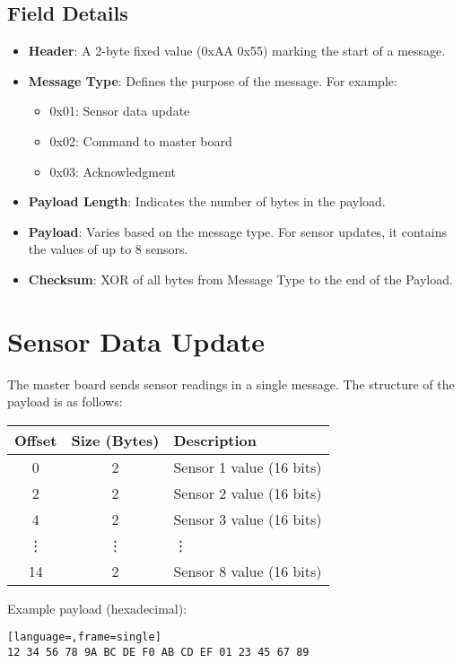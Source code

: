 \documentclass{article}
\begin{document}
\subsection{Field Details}
\begin{itemize}
    \item \textbf{Header}: A 2-byte fixed value (0xAA 0x55) marking the start of a message.
    \item \textbf{Message Type}: Defines the purpose of the message. For example:
    \begin{itemize}
        \item 0x01: Sensor data update
        \item 0x02: Command to master board
        \item 0x03: Acknowledgment
    \end{itemize}
    \item \textbf{Payload Length}: Indicates the number of bytes in the payload.
    \item \textbf{Payload}: Varies based on the message type. For sensor updates, it contains the values of up to 8 sensors.
    \item \textbf{Checksum}: XOR of all bytes from Message Type to the end of the Payload.
\end{itemize}

\section{Sensor Data Update}
The master board sends sensor readings in a single message. The structure of the payload is as follows:
\begin{center}
    \begin{tabular}{|c|c|l|}
        \hline
        \textbf{Offset} & \textbf{Size (Bytes)} & \textbf{Description} \\
        \hline
        0 & 2 & Sensor 1 value (16 bits) \\
        \hline
        2 & 2 & Sensor 2 value (16 bits) \\
        \hline
        4 & 2 & Sensor 3 value (16 bits) \\
        \hline
        \vdots & \vdots & \vdots \\
        \hline
        14 & 2 & Sensor 8 value (16 bits) \\
        \hline
    \end{tabular}
\end{center}

Example payload (hexadecimal):
\begin{lstlisting}[language=,frame=single]
12 34 56 78 9A BC DE F0 AB CD EF 01 23 45 67 89
\end{lstlisting}
\end{document}
